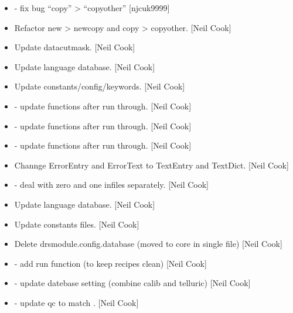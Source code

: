 \documentclass[a4paper,10pt,english]{report}
\begin{document}
\begin{itemize}
\item {} 
 - fix bug “copy” \textendash{}\textgreater{} “copyother” {[}njcuk9999{]}

\item {} 
Refactor new \textendash{}\textgreater{} newcopy   and copy \textendash{}\textgreater{} copyother. {[}Neil Cook{]}

\item {} 
Update datacutmask. {[}Neil Cook{]}

\item {} 
Update language database. {[}Neil Cook{]}

\item {} 
Update constants/config/keywords. {[}Neil Cook{]}

\item {} 
 - update functions after run through. {[}Neil Cook{]}

\item {} 
 - update functions after run through. {[}Neil Cook{]}

\item {} 
 - update functions after run through. {[}Neil Cook{]}

\item {} 
Channge ErrorEntry and ErrorText to TextEntry and TextDict. {[}Neil
Cook{]}

\item {} 
 - deal with zero and one infiles separately. {[}Neil Cook{]}

\item {} 
Update language database. {[}Neil Cook{]}

\item {} 
Update constants files. {[}Neil Cook{]}

\item {} 
Delete drsmodule.config.database (moved to core in single  file)
{[}Neil Cook{]}

\item {} 
 - add run function (to keep recipes clean) {[}Neil Cook{]}

\item {} 
 - update datebase setting (combine calib and telluric)
{[}Neil Cook{]}

\item {} 
 - update qc to match . {[}Neil Cook{]}


\end{itemize}
\end{document}
